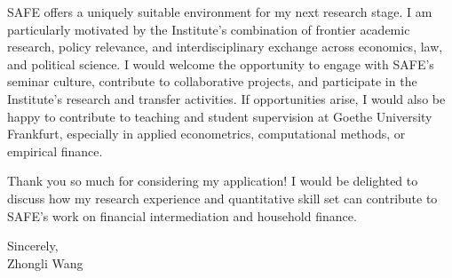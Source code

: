 \documentclass[11pt]{article}
\begin{document}
SAFE offers a uniquely suitable environment for my next research stage. 
I am particularly motivated by the Institute's combination of frontier academic research, policy relevance, and interdisciplinary exchange across economics, law, and political science. 
I would welcome the opportunity to engage with SAFE's seminar culture, contribute to collaborative projects, and participate in the Institute's research and transfer activities. 
If opportunities arise, I would also be happy to contribute to teaching and student supervision at Goethe University Frankfurt, especially in applied econometrics, computational methods, or empirical finance.

Thank you so much for considering my application! 
I would be delighted to discuss how my research experience and quantitative skill set can contribute to SAFE's work on financial intermediation and household finance.

\vspace{6mm}

\noindent Sincerely,\\[15mm]
\noindent Zhongli Wang
\end{document}
